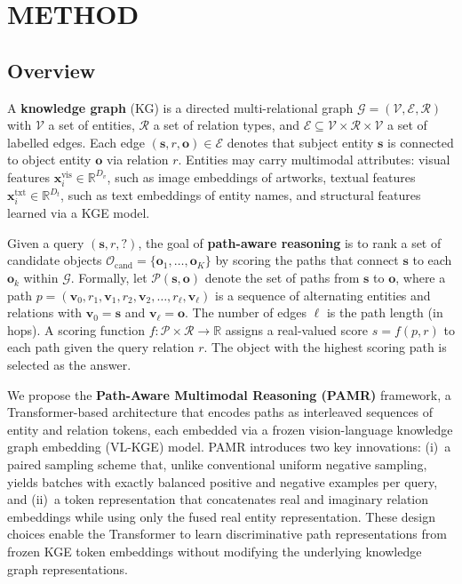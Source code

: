 \vspace{-1em}
\section{\uppercase{Method}}
\label{sec:method}
\vspace{-1em}
\subsection{Overview}
\vspace{-1em}

A \textbf{knowledge graph} (KG) is a directed multi-relational graph
$\mathcal{G} = (\mathcal{V}, \mathcal{E}, \mathcal{R})$ with
$\mathcal{V}$ a set of entities, $\mathcal{R}$ a set of relation types,
and $\mathcal{E} \subseteq \mathcal{V} \times \mathcal{R} \times \mathcal{V}$
a set of labelled edges.  Each edge $(\mathbf{s}, r, \mathbf{o}) \in \mathcal{E}$
denotes that subject entity $\mathbf{s}$ is connected to object entity $\mathbf{o}$
via relation $r$.  Entities may carry multimodal attributes: visual features
$\mathbf{x}^{\text{vis}}_i \in \mathbb{R}^{D_v}$, such as image embeddings of artworks,
textual features $\mathbf{x}^{\text{txt}}_i \in \mathbb{R}^{D_t}$, such as text
embeddings of entity names, and structural features learned via a KGE model.

Given a query $(\mathbf{s}, r, ?)$, the goal of \textbf{path-aware reasoning} is to
rank a set of candidate objects $\mathcal{O}_{\text{cand}} = \{\mathbf{o}_1, \ldots, \mathbf{o}_K\}$
by scoring the paths that connect $\mathbf{s}$ to each $\mathbf{o}_k$ within $\mathcal{G}$.
Formally, let $\mathcal{P}(\mathbf{s}, \mathbf{o})$ denote the set of paths from
$\mathbf{s}$ to $\mathbf{o}$, where a path
$p = (\mathbf{v}_0, r_1, \mathbf{v}_1, r_2, \mathbf{v}_2, \ldots, r_\ell, \mathbf{v}_\ell)$
is a sequence of alternating entities and relations with $\mathbf{v}_0 = \mathbf{s}$ and
$\mathbf{v}_\ell = \mathbf{o}$.  The number of edges $\ell$ is the path length (in hops).
A scoring function $f: \mathcal{P} \times \mathcal{R} \to \mathbb{R}$ assigns a real-valued
score $s = f(p, r)$ to each path given the query relation $r$.  The object with the
highest scoring path is selected as the answer.

We propose the \textbf{Path-Aware Multimodal Reasoning (PAMR)} framework, a Transformer-based
architecture that encodes paths as interleaved sequences of entity and relation tokens,
each embedded via a frozen vision-language knowledge graph embedding (VL-KGE) model.
PAMR introduces two key innovations: (i)~a paired sampling scheme that, unlike
conventional uniform negative sampling, yields batches with exactly balanced positive
and negative examples per query, and (ii)~a token representation that
concatenates real and imaginary relation embeddings while using only the fused real entity
representation.  These design choices enable the Transformer to learn discriminative path
representations from frozen KGE token embeddings without modifying the underlying knowledge graph
representations.

